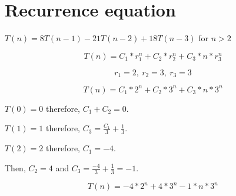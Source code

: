 \documentclass[a4paper,12pt]{article}
\begin{document}
\section{Recurrence equation}
$T(n)=8T(n-1)-21T(n-2)+18T(n-3)$ for $n>2$

$$T(n) = C_1*r_1^n + C_2*r_2^n + C_3*n*r_3^n$$

$$r_1 = 2,\ r_2 = 3,\ r_3 = 3$$

$$T(n) = C_1 * 2^n + C_2 * 3^n + C_3 * n * 3^n$$

$T(0) = 0$ therefore, $C_1 + C_2 = 0$.

$T(1) = 1$ therefore, $C_3 = \frac{C_1}{3} + \frac{1}{3}$.

$T(2) = 2$ therefore, $C_1 = -4$.

Then, $C_2 = 4$ and $C_3 = \frac{-4}{3} + \frac{1}{3} = -1$.

$$T(n) = -4 * 2^n + 4 * 3^n - 1 * n * 3^n$$
\end{document}
